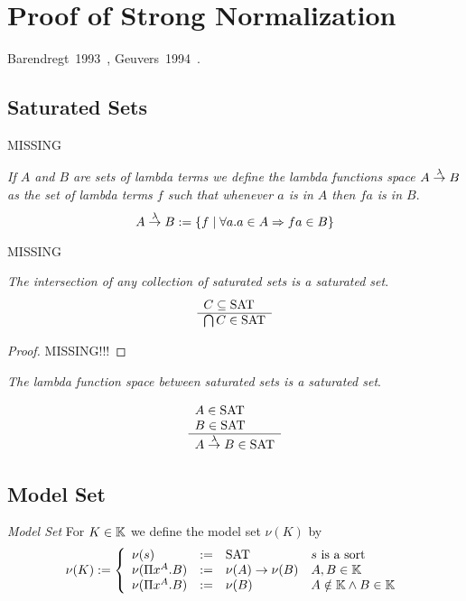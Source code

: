 \section{Proof of Strong Normalization}

Barendregt~1993~\cite{barendregt1993}, Geuvers~1994~\cite{geuvers1994}.




\subsection{Saturated Sets}

MISSING



\begin{definition}
    \emph{If $A$ and $B$ are sets of lambda terms we define the lambda functions
    space $A \stackrel{\lambda}{\to} B$ as the set of lambda terms $f$ such that whenever $a$
    is in $A$ then $fa$ is in $B$}.
    $$
    A \stackrel{\lambda}{\to} B := {\{f \mid \forall a. a \in A \Rightarrow fa \in B\}}
    $$
\end{definition}

MISSING

\begin{theorem}
    \label{SaturatedSetsIntersection}
    \emph{The intersection of any collection of saturated sets is a saturated
    set}.
    $$
    \begin{array}{l} 
        C \subseteq \text{SAT}
     \\ \hline 
        \bigcap C \in \text{SAT}
    \end{array}
    $$
    \begin{proof}
        MISSING!!!
    \end{proof}
\end{theorem}





\begin{theorem}
    \label{LambdaSpaceSaturated}
    \emph{The lambda function space between saturated sets is a saturated set}.

    $$
    \begin{array}{l} 
        A \in \text{SAT}
        \\
        B \in \text{SAT}
     \\ \hline 
        A \stackrel{\lambda}{\to} B \in \text{SAT}
    \end{array}
    $$
\end{theorem}




\subsection{Model Set}

\begin{definition}
    \emph{Model Set} For $K \in \mathbb{K}$ we define the model set
    $\nu(K)$ by
    $$
        \nu(K) :=
        \left \{
        \begin{array}{llll}
            \nu(s) &:=& \text{SAT} & s \text{ is a sort}
            \\
            \nu(\Pi x^A. B) &:=& \nu(A)\to \nu(B) & A,B \in \mathbb{K}
            \\
            \nu(\Pi x^A. B) &:=& \nu(B) & A \notin \mathbb{K} \land B \in \mathbb{K}
        \end{array}
        \right.
    $$
\end{definition}



